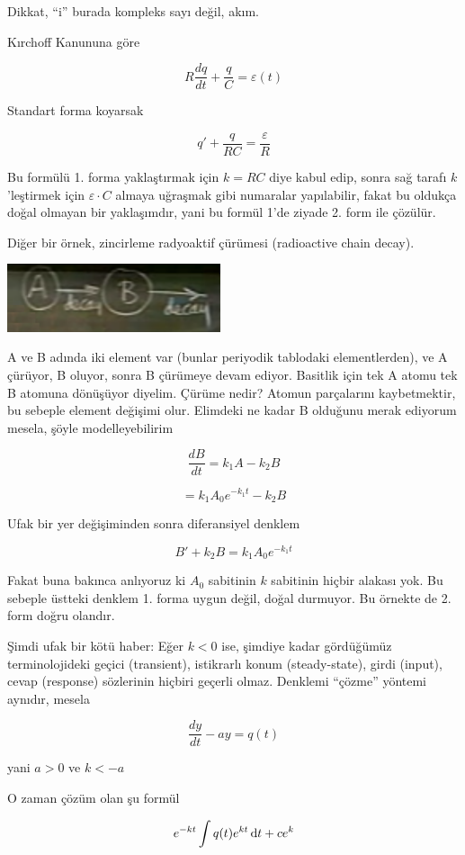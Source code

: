 \documentclass[12pt,fleqn]{article}\usepackage{../../common}
\begin{document}
Dikkat, ``i'' burada kompleks sayı değil, akım. 

Kırchoff Kanununa göre

$$ R\frac{dq}{dt} + \frac{q}{C} = \varepsilon(t) $$

Standart forma koyarsak

$$ q' + \frac{q}{RC} = \frac{\varepsilon}{R} $$

Bu formülü 1. forma yaklaştırmak için $k=RC$ diye kabul edip, sonra sağ
tarafı $k$'leştirmek için $\varepsilon \cdot C$ almaya uğraşmak gibi
numaralar yapılabilir, fakat bu oldukça doğal olmayan bir yaklaşımdır, yani
bu formül 1'de ziyade 2. form ile çözülür. 

Diğer bir örnek, zincirleme radyoaktif çürümesi (radioactive chain decay). 

\includegraphics[height=2cm]{8_7.png}

A ve B adında iki element var (bunlar periyodik tablodaki elementlerden),
ve A çürüyor, B oluyor, sonra B çürümeye devam ediyor. Basitlik için tek A
atomu tek B atomuna dönüşüyor diyelim. Çürüme nedir? Atomun parçalarını
kaybetmektir, bu sebeple element değişimi olur. Elimdeki ne kadar B
olduğunu merak ediyorum mesela, şöyle modelleyebilirim 

$$ \frac{dB}{dt} = k_1 A - k_2 B$$

$$ = k_1A_0 e^{-k_1t} - k_2B $$

Ufak bir yer değişiminden sonra diferansiyel denklem 

$$ B' + k_2 B = k_1A_0 e^{-k_1t}$$

Fakat buna bakınca anlıyoruz ki $A_0$ sabitinin $k$ sabitinin hiçbir
alakası yok. Bu sebeple üstteki denklem 1. forma uygun değil, doğal
durmuyor. Bu örnekte de 2. form doğru olandır. 

Şimdi ufak bir kötü haber: Eğer $k < 0$ ise, şimdiye kadar gördüğümüz
terminolojideki geçici (transient), istikrarlı konum (steady-state), girdi
(input), cevap (response) sözlerinin hiçbiri geçerli olmaz. Denklemi
``çözme'' yöntemi aynıdır, mesela

$$ \frac{dy}{dt} - ay = q(t)$$

yani $a > 0$ ve $k < -a$

O zaman çözüm olan şu formül

$$ e^{-kt} \int q(t) e^{kt} \,\mathrm{d} t + ce^k$$
\end{document}
